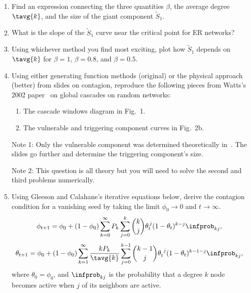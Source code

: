 \begin{enumerate}
\item

  Find an expression connecting the three quantities 
  $\beta$, the average degree $\tavg{k}$, 
  and the size of the giant component $\tilde{S}_{1}$.

  
   \solutionstart


   \solutionend
  

\item
  What is the slope of the $\tilde{S}_{1}$ curve near the critical
  point for ER networks?

  
   \solutionstart


   \solutionend

\item
  \label{ass7.endq}

  Using whichever method you find most exciting, plot
  how $\tilde{S}_{1}$ depends on $\tavg{k}$ for $\beta=1$, $\beta=0.8$,
  and $\beta=0.5$.

  
   \solutionstart


   \solutionend



\item
  Using either generating function methods (original) or the physical approach
  (better) from slides on contagion,
  reproduce the following pieces 
  from Watts's 2002 paper~\cite{watts2002a} on global cascades on random networks:
  \begin{enumerate}
  \item 
    The cascade windows diagram in Fig.~1.  
  \item 
    The vulnerable and triggering component curves in Fig.~2b.
  \end{enumerate}

  Note 1: Only the vulnerable component was determined
  theoretically in~\cite{watts2002a}.  The slides go further
  and determine the triggering component's size.

  Note 2: This question is all theory but you will need
  to solve the second and third problems numerically.

\item 
  Using Gleeson and Calahane's iterative equations below,
  derive the contagion condition for
  a vanishing seed by taking the limit
  $\phi_{0} \rightarrow 0$ and $t \rightarrow \infty$.
  $$
  \phi_{t+1}
  = 
  \phi_{0}
  + 
  (1-\phi_{0})
  \sum_{k=0}^{\infty}
  P_{k}
  \sum_{j=0}^{k}
  \binom{k}{j}
  \theta_{t}^{\, j}
  (1-\theta_{t})^{k-j} 
  \infprob_{kj},
  $$
  $$
  \theta_{t+1}
  =
  \phi_{0} +
  (1-\phi_{0})
  \sum_{k=1}^{\infty}
  \frac{k P_{k}}{\tavg{k}}
  \sum_{j=0}^{k-1}
  \binom{k-1}{j}
  \theta_{t}^{\ j}
  (1-\theta_{t})^{k-1-j}
  \infprob_{kj},
  $$
  where $\theta_{0} = \phi_{0}$, and 
  $\infprob_{kj}$ is the probability 
  that a degree $k$ node becomes active
  when $j$ of its neighbors are active.


\end{enumerate}
